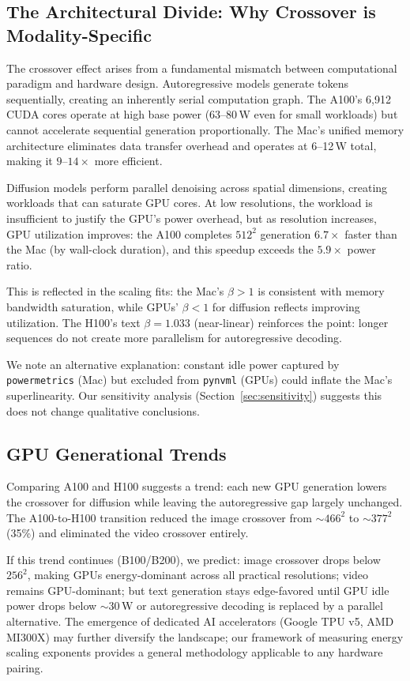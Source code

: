 \documentclass[acmlarge,manuscript,screen,review]{acmart}
\begin{document}
\subsection{The Architectural Divide: Why Crossover is Modality-Specific}

The crossover effect arises from a fundamental mismatch between computational paradigm and hardware design. Autoregressive models generate tokens sequentially, creating an inherently serial computation graph. The A100's 6,912 CUDA cores operate at high base power (63--80\,W even for small workloads) but cannot accelerate sequential generation proportionally. The Mac's unified memory architecture eliminates data transfer overhead and operates at 6--12\,W total, making it $9$--$14\times$ more efficient.

Diffusion models perform parallel denoising across spatial dimensions, creating workloads that can saturate GPU cores. At low resolutions, the workload is insufficient to justify the GPU's power overhead, but as resolution increases, GPU utilization improves: the A100 completes $512^2$ generation $6.7\times$ faster than the Mac (by wall-clock duration), and this speedup exceeds the $5.9\times$ power ratio.

This is reflected in the scaling fits: the Mac's $\beta > 1$ is consistent with memory bandwidth saturation, while GPUs' $\beta < 1$ for diffusion reflects improving utilization. The H100's text $\beta = 1.033$ (near-linear) reinforces the point: longer sequences do not create more parallelism for autoregressive decoding.

We note an alternative explanation: constant idle power captured by \texttt{powermetrics} (Mac) but excluded from \texttt{pynvml} (GPUs) could inflate the Mac's superlinearity. Our sensitivity analysis (Section~\ref{sec:sensitivity}) suggests this does not change qualitative conclusions.

\subsection{GPU Generational Trends}

Comparing A100 and H100 suggests a trend: each new GPU generation lowers the crossover for diffusion while leaving the autoregressive gap largely unchanged. The A100-to-H100 transition reduced the image crossover from ${\sim}466^2$ to ${\sim}377^2$ (35\%) and eliminated the video crossover entirely.

If this trend continues (B100/B200), we predict: image crossover drops below $256^2$, making GPUs energy-dominant across all practical resolutions; video remains GPU-dominant; but text generation stays edge-favored until GPU idle power drops below ${\sim}30$\,W or autoregressive decoding is replaced by a parallel alternative. The emergence of dedicated AI accelerators (Google TPU v5, AMD MI300X) may further diversify the landscape; our framework of measuring energy scaling exponents provides a general methodology applicable to any hardware pairing.
\end{document}
